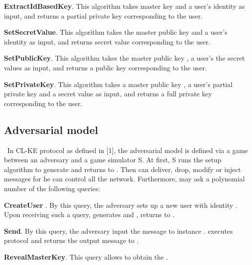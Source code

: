 \documentclass[final,1p,times,twocolumn]{elsarticle}
\begin{document}
\vspace{0.2cm}

{\bf ExtractIdBasedKey}. This algorithm takes master key  and a user's identity  as input, and returns a partial private key  corresponding to the user.

\vspace{0.2cm}

{\bf SetSecretValue}. This algorithm takes the master public key  and a user's identity  as input, and returns secret value  corresponding to the user.

\vspace{0.2cm}

{\bf SetPublicKey}. This algorithm takes the master public key , a user's the secret values  as input, and returns a public key  corresponding to the user.

\vspace{0.2cm}

{\bf SetPrivateKey}. This algorithm takes a master public key , a user's partial private key  and a  secret value  as input, and returns a full private key  corresponding to the user.


\vspace{0.3cm}

\subsection{Adversarial model}
\label{2.2}

\ In CL-KE protocol as defined in [1], the adversarial model is defined via a game between an adversary  and a game simulator S. At first, S runs the setup algorithm to generate  and returns  to . Then  can deliver, drop, modify or inject messages for he can control all the network. Furthermore,  may ask a polynomial number of the following queries:

\vspace{0.2cm}

{\bf CreateUser }. By this query, the adversary  sets up a new user with identity . Upon receiving such a query,  generates  and , returns  to .

\vspace{0.2cm}

{\bf Send}. By this query, the adversary  input the message  to instance .  executes protocol and returns the output message  to .

\vspace{0.2cm}

{\bf RevealMasterKey}. This query allows  to obtain the .
\end{document}
